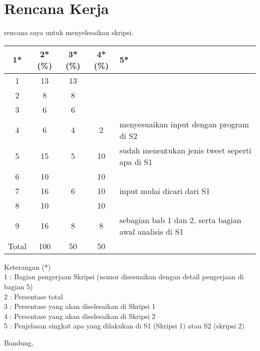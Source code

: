 \documentclass[a4paper,twoside]{article}
\begin{document}
\section{Rencana Kerja}
rencana saya untuk menyelesaikan skripsi.

\begin{center}
  \begin{tabular}{ | c | c | c | c | l |}
    \hline
    1*  & 2*(\%) & 3*(\%) & 4*(\%) &5*\\ \hline \hline
    1   & 13  & 13  &  &  \\ \hline
    2   & 8 & 8  &   & \\ \hline
    3   & 6  & 6  &  & \\ \hline
    4   & 6  & 4  &  2 & {\footnotesize menyesuaikan input dengan program di S2} \\ \hline
    5   & 15  & 5  & 10 & {\footnotesize sudah menentukan jenis tweet seperti apa di S1} \\ \hline
    6   & 10 &   & 10  & \\ \hline
    7   & 16  &  6 & 10 &   {\footnotesize input mulai dicari dari S1} \\ \hline
    8   & 10  &   &  10  & \\ \hline
    9   & 16  & 8  & 8  & {\footnotesize sebagian bab 1 dan 2, serta bagian awal analisis di S1}\\ \hline
    Total  & 100  & 50  & 50 &  \\ \hline
                          \end{tabular}
\end{center}

Keterangan (*)\\
1 : Bagian pengerjaan Skripsi (nomor disesuaikan dengan detail pengerjaan di bagian 5)\\
2 : Persentase total \\
3 : Persentase yang akan diselesaikan di Skripsi 1 \\
4 : Persentase yang akan diselesaikan di Skripsi 2 \\
5 : Penjelasan singkat apa yang dilakukan di S1 (Skripsi 1) atau S2 (skripsi 2)

\vspace{1cm}
\centering Bandung, \tanggal\\
\vspace{2cm} \nama \\ 
\vspace{1cm}
\end{document}
